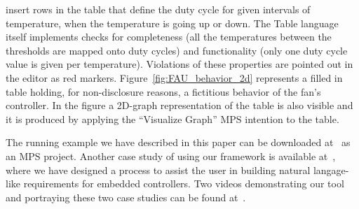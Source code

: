 insert rows in the table that define the duty cycle for given intervals of
temperature, when the temperature is going up or down.
The \textsf{Table} language itself implements checks for completeness (all the
temperatures between the thresholds are mapped onto duty cycles) and
functionality (only one duty cycle value is given per temperature). Violations
of these properties are pointed out in the editor as red markers.
Figure~\ref{fig:FAU_behavior_2d} represents a filled in table holding, for
non-disclosure reasons, a fictitious behavior of the fan's controller.
In the figure a 2D-graph representation of the table is also visible and it is
produced by applying the “Visualize Graph” MPS intention to the table.

The running example we have described in this paper can be downloaded
at~\cite{coolingControllerProcess} as an MPS project. Another case study of
using our framework is available at~\cite{earsctrlProcess}, where we have
designed a process to assist the user in building natural langage-like
requirements for embedded controllers. Two videos demonstrating our
tool and portraying these two case studies can be found
at~\cite{coolingControllerProcessVideo,earsctrlProcessVideo}.
 \vspace{-.4cm}
  




